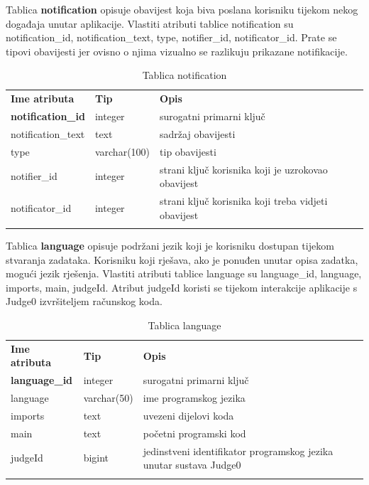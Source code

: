 \documentclass[times, utf8, zavrsni, numeric]{fer}
\begin{document}
		Tablica \textbf{notification} opisuje obavijest koja biva poslana korisniku tijekom nekog događaja unutar aplikacije. Vlastiti atributi tablice notification su notification\_id, notification\_text, type, notifier\_id, notificator\_id. Prate se tipovi obavijesti jer ovisno o njima vizualno se razlikuju prikazane notifikacije.
		\begin{table}[H]
			\caption{Tablica notification}
			\label{tbl:notification}
			\centering
			\begin{tabu} to \textwidth {XXX}
				\tabucline[1.75pt]{-}
				\textbf{Ime atributa} & \textbf{Tip} & \textbf{Opis}\\ 				
				\tabucline[1.75pt]{-}
				\textbf{notification\_id} & integer & surogatni primarni ključ\\ \hline
				notification\_text & text & sadržaj obavijesti\\ \hline
				type & varchar(100) & tip obavijesti\\ \hline
				notifier\_id & integer & strani ključ korisnika koji je uzrokovao obavijest\\ \hline
				notificator\_id & integer & strani ključ korisnika koji treba vidjeti obavijest\\ \hline
				\tabucline[1.75pt]{-}
			\end{tabu}
		\end{table}
	
		Tablica \textbf{language} opisuje podržani jezik koji je korisniku dostupan tijekom stvaranja zadataka. Korisniku koji rješava, ako je ponuđen unutar opisa zadatka, mogući jezik rješenja. Vlastiti atributi tablice language su language\_id, language, imports, main, judgeId. Atribut judgeId koristi se tijekom interakcije aplikacije s Judge0 izvršiteljem računskog koda. 
		\begin{table}[H]
			\caption{Tablica language}
			\label{tbl:language}
			\centering
			\begin{tabu} to \textwidth {XXX}
				\tabucline[1.75pt]{-}
				\textbf{Ime atributa} & \textbf{Tip} & \textbf{Opis}\\ 				
				\tabucline[1.75pt]{-}
				\textbf{language\_id} & integer & surogatni primarni ključ\\ \hline
				language & varchar(50) & ime programskog jezika\\ \hline
				imports & text & uvezeni dijelovi koda\\ \hline
				main & text & početni programski kod\\ \hline
				judgeId & bigint & jedinstveni identifikator programskog jezika unutar sustava Judge0\\ \hline
				\tabucline[1.75pt]{-}
			\end{tabu}
		\end{table}
	
\end{document}
